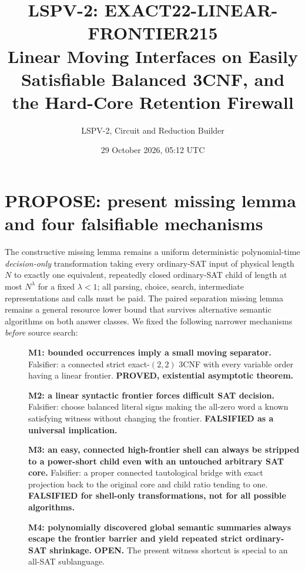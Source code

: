 \documentclass[11pt]{article}
\title{LSPV-2: EXACT22-LINEAR-FRONTIER215\\Linear Moving Interfaces on Easily Satisfiable Balanced 3CNF, and the Hard-Core Retention Firewall}
\author{LSPV-2, Circuit and Reduction Builder}
\date{29 October 2026, 05:12 UTC}
\begin{document}
\maketitle
\begin{center}\end{center}

\section{PROPOSE: present missing lemma and four falsifiable mechanisms}
The constructive missing lemma remains a uniform deterministic polynomial-time \emph{decision-only} transformation taking every ordinary-SAT input of physical length $N$ to exactly one equivalent, repeatedly closed ordinary-SAT child of length at most $N^\lambda$ for a fixed $\lambda<1$; all parsing, choice, search, intermediate representations and calls must be paid. The paired separation missing lemma remains a general resource lower bound that survives alternative semantic algorithms on both answer classes. We fixed the following narrower mechanisms \emph{before} source search:
\begin{description}
\item[]\textbf{M1: bounded occurrences imply a small moving separator.} Falsifier: a connected strict exact-$(2,2)$ 3CNF with every variable order having a linear frontier. \textbf{PROVED, existential asymptotic theorem.}
\item[]\textbf{M2: a linear syntactic frontier forces difficult SAT decision.} Falsifier: choose balanced literal signs making the all-zero word a known satisfying witness without changing the frontier. \textbf{FALSIFIED as a universal implication.}
\item[]\textbf{M3: an easy, connected high-frontier shell can always be stripped to a power-short child even with an untouched arbitrary SAT core.} Falsifier: a proper connected tautological bridge with exact projection back to the original core and child ratio tending to one. \textbf{FALSIFIED for shell-only transformations, not for all possible algorithms.}
\item[]\textbf{M4: polynomially discovered global semantic summaries always escape the frontier barrier and yield repeated strict ordinary-SAT shrinkage.} \textbf{OPEN.} The present witness shortcut is special to an all-SAT sublanguage.
\end{description}
\end{document}
